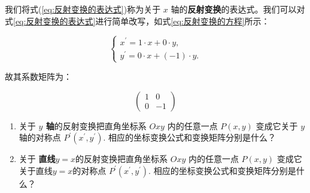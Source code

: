 我们将式(\ref{eq:反射变换的表达式})称为关于 $x$ 轴的\textcolor{third}{\bf 反射变换}的表达式。我们可以对式\ref{eq:反射变换的表达式}进行简单改写，如式\ref{eq:反射变换的方程}所示：

\begin{equation}
\left\{\begin{array}{l}
x^{\prime}=1 \cdot x + 0\cdot y, \\
y^{\prime}= 0\cdot x + (-1) \cdot y .
\end{array}\right.
\label{eq:反射变换的方程}
\end{equation}

故其系数矩阵为：

\begin{equation}
\left(\begin{array}{rr}
1  & 0 \\
0  & -1
\end{array}\right)
\label{eq:反射变换示例矩阵}
\end{equation}


\vspace{0.5cm}

\begin{exercise}
\begin{enumerate}
    \item 关于 \textbf{$y$ 轴}的反射变换把直角坐标系 $O x y$ 内的任意一点 $P(x, y)$ 变成它关于 $y$ 轴的对称点 $P^{\prime}\left(x^{\prime}, y^{\prime}\right)$. 相应的坐标变换公式和变换矩阵分别是什么？
    \item 关于 \textbf{直线$y=x$}的反射变换把直角坐标系 $O x y$ 内的任意一点 $P(x, y)$ 变成它关于直线$y=x$的对称点 $P^{\prime}\left(x^{\prime}, y^{\prime}\right)$. 相应的坐标变换公式和变换矩阵分别是什么？
\end{enumerate}
\end{exercise}

